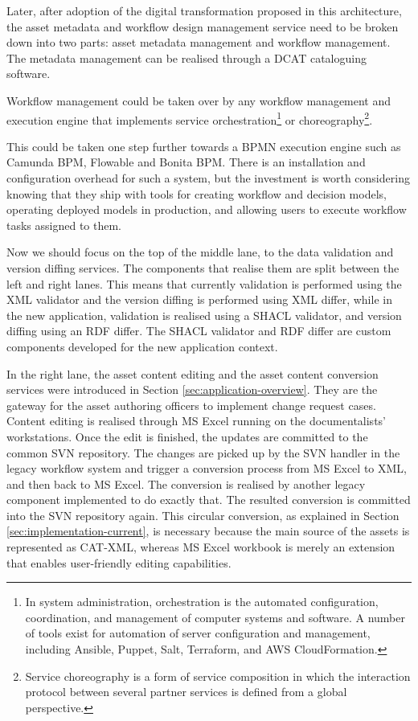 	Later, after adoption of the digital transformation proposed in this architecture, the asset metadata and workflow design management service need to be broken down into two parts: asset metadata management and workflow management. The metadata management can be realised through a DCAT \citep{dcat2} cataloguing software. 
	
	Workflow management could be taken over by any workflow management and execution engine that implements service orchestration\footnote{In system administration, orchestration is the automated configuration, coordination, and management of computer systems and software. A number of tools exist for automation of server configuration and management, including Ansible, Puppet, Salt, Terraform, and AWS CloudFormation.} or choreography\footnote{Service choreography is a form of service composition in which the interaction protocol between several partner services is defined from a global perspective.}. 
	
	This could be taken one step further towards a BPMN \citep{bpmn-introduction} execution engine such as Camunda BPM, Flowable and Bonita BPM. There is an installation and configuration overhead for such a system, but the investment is worth considering knowing that they ship with tools for creating workflow and decision models, operating deployed models in production, and allowing users to execute workflow tasks assigned to them. 
	
	\enlargethispage{1em}
	
	Now we should focus on the top of the middle lane, to the data validation and version diffing services. The components that realise them are split between the left and right lanes. This means that currently validation is performed using the XML validator and the version diffing is performed using XML differ, while in the new application, validation is realised using a SHACL \citep{shacl-spec} validator, and version diffing using an RDF differ. The SHACL validator and RDF differ are custom components developed for the new application context.
	
	In the right lane, the asset content editing and the asset content conversion services were introduced in Section \ref{sec:application-overview}. They are the gateway for the asset authoring officers to implement change request cases. Content editing is realised through MS Excel running on the documentalists' workstations. Once the edit is finished, the updates are committed to the common SVN repository. The changes are picked up by the SVN handler in the legacy workflow system and trigger a conversion process from MS Excel to XML, and then back to MS Excel. The conversion is realised by another legacy component implemented to do exactly that. The resulted conversion is committed into the SVN repository again. This circular conversion, as explained in Section \ref{sec:implementation-current}, is necessary because the main source of the assets is represented as CAT-XML, whereas MS Excel workbook is merely an extension that enables user-friendly editing capabilities.
	
